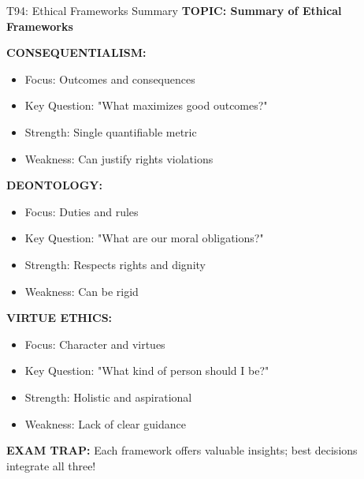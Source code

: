 \documentclass[8pt]{beamer}
\begin{document}
	\begin{frame}{T94: Ethical Frameworks Summary}
		\fontsize{6.5}{7.5}\selectfont
		\textbf{TOPIC: Summary of Ethical Frameworks}
		
		\vspace{0.1cm}
		\textbf{CONSEQUENTIALISM:}
		\begin{itemize}
			\item Focus: Outcomes and consequences
			\item Key Question: "What maximizes good outcomes?"
			\item Strength: Single quantifiable metric
			\item Weakness: Can justify rights violations
		\end{itemize}
		
		\vspace{0.1cm}
		\textbf{DEONTOLOGY:}
		\begin{itemize}
			\item Focus: Duties and rules
			\item Key Question: "What are our moral obligations?"
			\item Strength: Respects rights and dignity
			\item Weakness: Can be rigid
		\end{itemize}
		
		\vspace{0.1cm}
		\textbf{VIRTUE ETHICS:}
		\begin{itemize}
			\item Focus: Character and virtues
			\item Key Question: "What kind of person should I be?"
			\item Strength: Holistic and aspirational
			\item Weakness: Lack of clear guidance
		\end{itemize}
		
		\textcolor{myred}{\textbf{EXAM TRAP:}} Each framework offers \textcolor{myblue}{valuable insights}; best decisions integrate all three!
	\end{frame}
	
\end{document}
